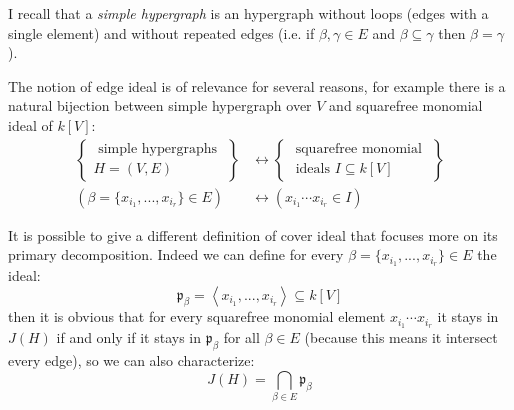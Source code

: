 \documentclass[notitlepage, a4]{book}
\theoremstyle{plain}
\theoremstyle{remark}
\theoremstyle{definition}
\newcommand{\p}{\mathfrak{p}}
\begin{document}
I recall that a \textit{simple hypergraph} is an hypergraph without loops (edges with a single element) and without repeated edges (i.e. if $ \beta, \gamma \in E$ and $ \beta \subseteq \gamma $ then $ \beta = \gamma $). 


The notion of edge ideal is of relevance for several reasons, for example there is a natural bijection between simple hypergraph over $ V $ and squarefree monomial ideal of $ k[V] $:
\begin{align*} \label{eq:bij}
\left\{\begin{array}{c}
\text { simple hypergraphs } \\
H=(V, E)
\end{array}\right\}
&  \leftrightarrow\left 
\{\begin{array}{c}
\text { squarefree monomial } \\
\text { ideals } I \subseteq k\left[V \right]
\end{array}\right\} \\
(\beta = \{ x_{i_1} , ... , x_{i_r}\} \in E )
&  \leftrightarrow  
(x_{i_1} \cdots x_{i_r} \in I)
\end{align*}


It is possible to give a different definition of cover ideal that focuses more on its primary decomposition. Indeed we can define for every $ \beta = \{ x_{i_1} , ... , x_{i_r}\} \in E  $ the ideal:
\begin{equation}\label{eq:prime}
\p_\beta = \left\langle  x_{i_1} , ... , x_{i_r} \right\rangle \subseteq k[V]
\end{equation}
then it is obvious that for every squarefree monomial element $ x_{i_1} \cdots x_{i_r} $ it stays in $ J(H) $ if and only if it stays in $ \p_\beta $ for all $ \beta \in E $ (because this means it intersect every edge), so we can also characterize: 
\begin{equation}\label{eq:coverideal2}
J(H) = \bigcap_{\beta \in E} \p_\beta
\end{equation}

%
\end{document}
